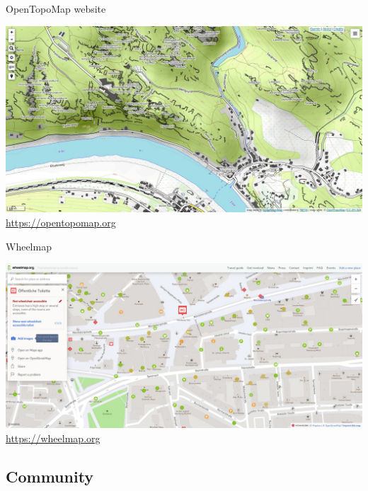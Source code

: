 \documentclass{beamer}
\begin{document}
			\begin{frame}{OpenTopoMap website}
				\begin{center}
					\includegraphics[height=0.7\textheight]{images/opentopomap-website.jpg}\\
					\url{https://opentopomap.org}
				\end{center}
			\end{frame}
			
			\begin{frame}{Wheelmap}
				\begin{center}
					\includegraphics[height=0.7\textheight]{images/wheelmap-website.jpg}\\
					\url{https://wheelmap.org}
				\end{center}
			\end{frame}

		\subsection{Community}
		
\end{document}
